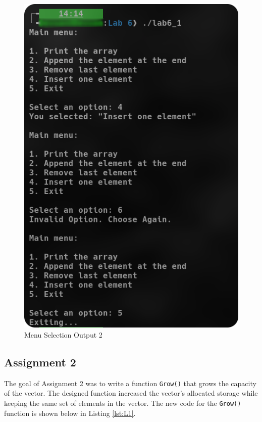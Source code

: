 \documentclass[
	letterpaper, %
	10pt, %
]{CSUniSchoolLabReport}
\begin{document}
\begin{figure}[H]
  \centering
  \includegraphics[height=.75\textheight]{Figures/6_1-2.png}
  \caption{Menu Selection Output 2}
  \label{fig:3}
\end{figure}

\subsection{Assignment 2}

\hspace{.5 in} The goal of Assignment 2 was to write a function \texttt{Grow()} that grows the capacity of the vector. The designed function increased the vector's allocated storage while keeping the same set of elements in the vector. The new code for the \texttt{Grow()} function is shown below in Listing \ref{lst:L1}. 

\newpage


\end{document}
